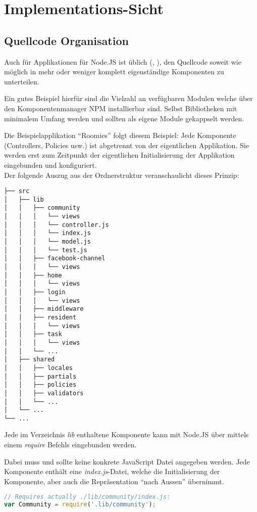 \section{Implementations-Sicht}
\subsection{Quellcode Organisation}
Auch für Applikationen für Node.JS ist üblich (\cite{TJH_ComponentStructure}, \cite{IZS_ComponentStructure}), den Quellcode soweit wie möglich in mehr oder weniger komplett eigenständige Komponenten zu unterteilen.

Ein gutes Beispiel hierfür sind die Vielzahl an verfügbaren Modulen welche über den Komponentenmanager NPM \cite{NPM} installierbar sind. Selbst Bibliotheken mit minimalem Umfang werden und sollten als eigene Module gekappselt werden.

Die Beispielapplikation ``Roomies'' folgt diesem Beispiel: Jede Komponente (Controllers, Policies usw.) ist abgetrennt von der eigentlichen Applikation. Sie werden erst zum Zeitpunkt der eigentlichen Initialisierung der Applikation eingebunden und konfiguriert.\\[0.5mm]

Der folgende Auszug aus der Ordnerstruktur veranschaulicht dieses Prinzip:
\begin{verbatim}
├── src
│   ├── lib
│   │   ├── community
│   │   │   └── views
│   │   │   └── controller.js
│   │   │   └── index.js
│   │   │   └── model.js
│   │   │   └── test.js
│   │   ├── facebook-channel
│   │   │   └── views
│   │   ├── home
│   │   │   └── views
│   │   ├── login
│   │   │   └── views
│   │   ├── middleware
│   │   ├── resident
│   │   │   └── views
│   │   ├── task
│   │   │   └── views
│   │   └── ...
│   ├── shared
│   │   ├── locales
│   │   ├── partials
│   │   ├── policies
│   │   ├── validators
│   │   └── ...
│   └── ...
└── ...
\end{verbatim}

Jede im Verzeichnis \emph{lib} enthaltene Komponente kann mit Node.JS über mittels einem \emph{require} Befehls eingebunden werden.

Dabei muss und sollte keine konkrete JavaScript Datei angegeben werden. Jede Komponente enthält eine \emph{index.js}-Datei, welche die Initialisierung der Komponente, aber auch die Repräsentation ``nach Aussen'' übernimmt.

\begin{lstlisting}[language=JavaScript, caption=Einbindung der Community-Komponenten]
// Requires actually ./lib/community/index.js:
var Community = require('.lib/community');
\end{lstlisting}
